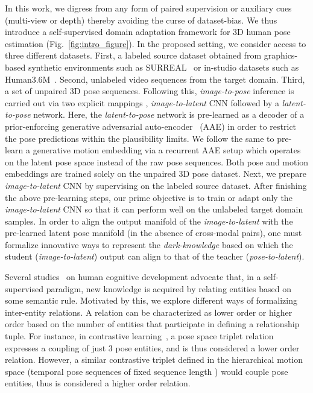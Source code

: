 \documentclass{article}
\begin{document}
In this work, we digress from any form of paired supervision or auxiliary cues (multi-view or depth) thereby avoiding the curse of dataset-bias. We thus introduce a self-supervised domain adaptation framework for 3D human pose estimation (Fig.~\ref{fig:intro_figure}). In the proposed setting, we consider access to three different datasets. First, a labeled source dataset obtained from graphics-based synthetic environments such as SURREAL~\cite{varol2017learning} or in-studio datasets such as Human3.6M~\cite{ionescu2013human3}. Second, unlabeled video sequences from the target domain. Third, a set of unpaired 3D pose sequences. Following this, \textit{image-to-pose} inference is carried out via two explicit mappings \ie, \textit{image-to-latent} CNN followed by a \textit{latent-to-pose} network. Here, the \textit{latent-to-pose} network is pre-learned as a decoder of a prior-enforcing generative adversarial auto-encoder~\cite{makhzani2015adversarial} (AAE) in order to restrict the pose predictions within the plausibility limits. We follow the same to pre-learn a generative motion embedding via a recurrent AAE setup which operates on the latent pose space instead of the raw pose sequences. Both pose and motion embeddings are trained solely on the unpaired 3D pose dataset. Next, we prepare \textit{image-to-latent} CNN by supervising on the labeled source dataset. After finishing the above pre-learning steps, our prime objective is to train or adapt only the \textit{image-to-latent} CNN so that it can perform well on the unlabeled target domain samples. In order to align the output manifold of the \textit{image-to-latent} with the pre-learned latent pose manifold 
(in the absence of cross-modal pairs), one must formalize innovative ways to  represent the \textit{dark-knowledge} based on which the student (\ie \textit{image-to-latent}) output can align to that of the teacher (\ie \textit{pose-to-latent}). 

Several studies~\cite{Gentner, Goldwater2018} on human cognitive development advocate that, in a self-supervised paradigm, new knowledge is acquired by relating entities based on some semantic rule. Motivated by this, we explore different ways of formalizing inter-entity relations. A relation can be characterized as lower order or higher order based on the number of entities that participate in defining a relationship tuple. For instance, in contrastive learning~\cite{oord2018representation,chen2020simple}, a pose space triplet relation expresses a coupling of just 3 pose entities, and is thus considered a lower order relation. However, a similar contrastive triplet defined in the hierarchical motion space (\ie temporal pose sequences of fixed sequence length ) would couple  pose entities, thus is considered a higher order relation. 
\end{document}
